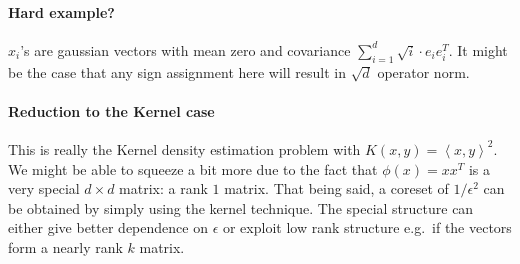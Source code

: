 \documentclass{article} %
\newcommand{\ip}[1]{\left \langle #1 \right \rangle}
\newcommand{\eps}{\epsilon}
\begin{document}
\paragraph{Hard example?}
$x_i$'s are gaussian vectors with mean zero and covariance $\sum_{i=1}^d \sqrt{i} \cdot e_i e_i^T$. It might be the case that any sign assignment here will result in $\sqrt{d}$ operator norm. 

\paragraph{Reduction to the Kernel case}
This is really the Kernel density estimation problem with $K(x,y) = \ip{x,y}^2$. We might be able to squeeze a bit more due to the fact that $\phi(x) = xx^T$ is a very special $d \times d$ matrix: a rank $1$ matrix. That being said, a coreset of $1/\eps^2$ can be obtained by simply using the kernel technique. The special structure can either give better dependence on $\eps$ or exploit low rank structure e.g.\ if the vectors form a nearly rank $k$ matrix.
%
%
%
%


\end{document}
